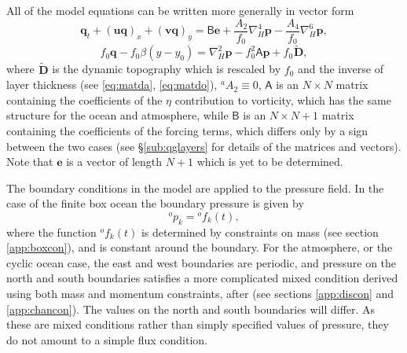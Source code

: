 \documentclass[11pt, a4paper,twoside]{article}
\newcommand{\p}[2]{{{}^{#1}p_{#2}}}
\newcommand{\f}[2]{{{}^{#1}f_{#2}}}
\newcommand{\at}[1]{{{}^{#1}A_2}}
\newcommand{\ah}[1]{{{}^{#1}A_4}}
\newcommand{\vc}[1]{\mathbf{#1}}
\newcommand{\mtx}[1]{\vc{\mathsf{#1}}}
\newcommand{\Dt}[1]{\vc{{}^{#1}\tilde{D}}}
\numberwithin{equation}{section}
\begin{document}
All of the model equations can be written more generally in vector form
\begin{equation}\label{eq:matr1}
\vc{q}_t  + (\vc{u} \vc{q})_x  + (\vc{v} \vc{q})_y = \mtx{B}\vc{e}   +\frac{\at{}}{f_0}\nabla_H^4 \vc{p}- \frac{\ah{}}{f_0}\nabla_H^6 \vc{p},
\end{equation}
\begin{equation}\label{eq:matr2}
f_0 \vc{q} - f_0 \beta(y-y_0)  =  \nabla_H^2 \vc{p}  - f_0^2 \mtx{A}\vc{p} + f_0 \Dt{},
\end{equation}
where $\Dt{}$ is the dynamic topography which is rescaled by $f_0$ and the inverse of layer thickness (see \ref{eq:matda}, \ref{eq:matdo}), $\at{a} \equiv 0$, $\mtx{A}$ is an $N \times N$ matrix containing the coefficients of the $\eta$ contribution to vorticity, which has the same structure for the ocean and atmosphere, while $\mtx{B}$ is an $N \times N+1$ matrix containing the coefficients of the forcing terms, which differs only by a sign between the two cases (see \S\ref{sub:qglayers} for details of the matrices and vectors).
Note that $\vc{e}$ is a vector of length $N+1$ which is yet to be determined.

The boundary conditions in the model are applied to the pressure field.
In the case of the finite box ocean the boundary pressure is given by
\begin{equation}\label{eq:bc1}
\p{o}{k} = \f{o}{k}(t),
\end{equation}
where the function $\f{o}{k}(t)$ is determined by constraints on mass
(see section \ref{app:boxcon}), and is constant around the boundary. 
For the atmosphere, or the cyclic ocean case, the east and west
boundaries are periodic, and pressure on the north and south boundaries
satisfies a more complicated mixed condition derived using
both mass and momentum constraints, after \citet{mcwilliams:77}
(see sections \ref{app:discon} and \ref{app:chancon}). 
The values on the north and south boundaries will differ. 
As these are mixed conditions rather than simply specified values of pressure, they do not amount to a simple flux condition.
\end{document}
